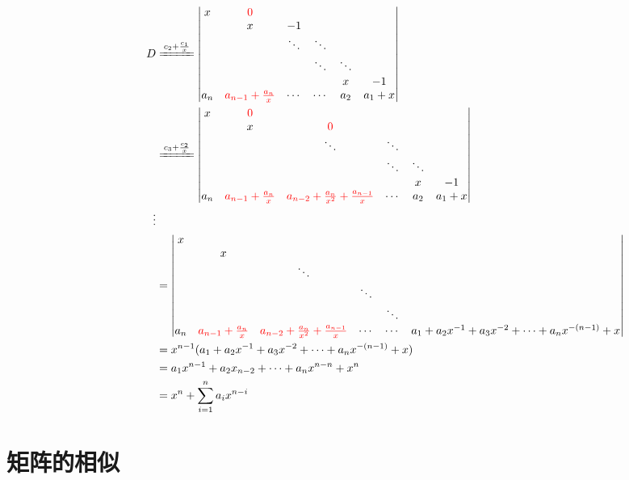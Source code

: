 \documentclass[a4paper]{report}
\begin{document}
\begin{jie}
\begin{align*}
D&\xlongequal{c_2+\frac{c_1}{x}}
\begin{vmatrix}
x&\textcolor[rgb]{1.00,0.00,0.00}{0}\\
&x&-1\\
&&\ddots&\ddots\\
&&&\ddots&\ddots\\
&&&&x&-1\\
a_{n}&\textcolor[rgb]{1.00,0.00,0.00}{a_{n-1}+\frac{a_n}{x}}&\cdots&\cdots&a_2&a_1+x
\end{vmatrix}\\ &\xlongequal{c_3+\frac{c_2}{x}}
\begin{vmatrix}
x&\textcolor[rgb]{1.00,0.00,0.00}{0}\\
&x&\textcolor[rgb]{1.00,0.00,0.00}{0}\\
&&\ddots&\ddots\\
&&&\ddots&\ddots\\
&&&&x&-1\\
a_{n}&\textcolor[rgb]{1.00,0.00,0.00}{a_{n-1}+\frac{a_n}{x}}&\textcolor[rgb]{1.00,0.00,0.00}{a_{n-2}+\frac{a_n}{x^2}+\frac{a_{n-1}}{x}}&\cdots&a_2&a_1+x
\end{vmatrix}
\\
\hphantom{~~~~~~~~~~~~~~~~~~}\vdots
\\
&=\begin{vmatrix}
x\\
&x\\
&&\ddots\\
&&&\ddots\\
&&&&\ddots&\\
a_{n}&\textcolor[rgb]{1.00,0.00,0.00}{a_{n-1}+\frac{a_n}{x}}&\textcolor[rgb]{1.00,0.00,0.00}{a_{n-2}+\frac{a_n}{x^2}+\frac{a_{n-1}}{x}}&\cdots&\cdots&a_1+a_2x^{-1}+a_{3}x^{-2}+\cdots+a_nx^{-(n-1)}+x
\end{vmatrix}
\\
&=x^{n-1}(a_1+a_2x^{-1}+a_{3}x^{-2}+\cdots+a_nx^{-(n-1)}+x)\\
&=a_1x^{n-1}+a_2x_{n-2}+\cdots+a_nx^{n-n}+x^{n}\\
&=x^{n}+\sum_{i=1}^{n}a_ix^{n-i}
\end{align*}
\end{jie}

\chapter{矩阵的相似}
\EX 
\end{document}
